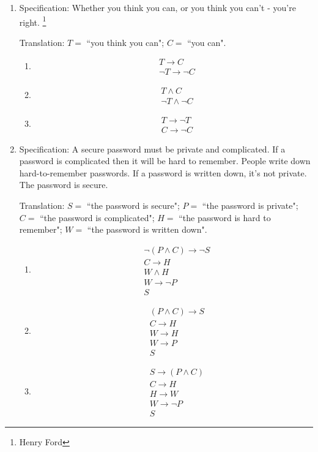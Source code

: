 \documentclass[12pt, oneside]{article}
\begin{document}
\begin{enumerate}
\begin{enumerate}
    \newpage
    \item Specification: Whether you think you can, or you think you can't - you're right.
\footnote{Henry Ford}
    
    Translation: $T =$ ``you  think  you  can"; $C = $  ``you  can".
    
    \begin{enumerate}
        \item \begin{align*} &T \to C \\&  \neg T \to \neg C \end{align*}
        \item \begin{align*} &T \wedge C \\  & \neg  T \wedge \neg C \end{align*}
        \item \begin{align*} &T \to \neg T  \\ & C  \to \neg  C \end{align*}
    \end{enumerate}
    
    \item Specification: A secure password must be private and complicated. If
    a password is  complicated then  it will be hard to  remember.  People
    write down hard-to-remember passwords. If a password is written down, it's  not private.   The password is secure.

    Translation: $S =$ ``the password is secure"; $P = $ ``the password is private"; 
    $C = $  ``the password is  complicated"; $H = $ ``the password is hard to remember";
    $W =  $ ``the password is written down".
    
    \begin{enumerate}
        \item \begin{align*} &\neg (P \wedge C) \to \neg  S  \\ & C \to H  \\ & W \wedge H \\ & W \to  \neg P \\ & S \end{align*}
        \item \begin{align*} &(P \wedge  C)  \to S  \\ &  C \to H\\ & W  \to  H \\  & W \to P \\ & S\end{align*}
        \item \begin{align*} & S  \to (P \wedge C)  \\ &  C \to H\\ & H  \to  W \\  & W \to \neg P \\ & S\end{align*}
\end{enumerate}

\end{enumerate}
\end{enumerate}
\end{document}
